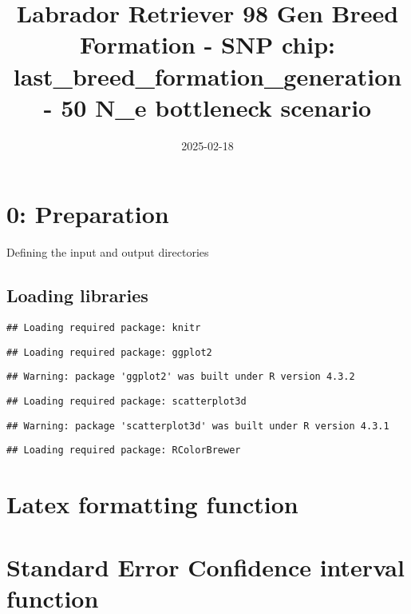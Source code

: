 \documentclass[
]{article}
\title{Labrador Retriever 98 Gen Breed Formation - SNP chip:
last\_breed\_formation\_generation - 50 N\_e bottleneck scenario}
\author{}
\date{\vspace{-2.5em}2025-02-18}
\begin{document}
\maketitle

{
\setcounter{tocdepth}{2}
\tableofcontents
}
\section{0: Preparation}\label{preparation}

Defining the input and output directories

\subsection{Loading libraries}\label{loading-libraries}

\begin{verbatim}
## Loading required package: knitr
\end{verbatim}

\begin{verbatim}
## Loading required package: ggplot2
\end{verbatim}

\begin{verbatim}
## Warning: package 'ggplot2' was built under R version 4.3.2
\end{verbatim}

\begin{verbatim}
## Loading required package: scatterplot3d
\end{verbatim}

\begin{verbatim}
## Warning: package 'scatterplot3d' was built under R version 4.3.1
\end{verbatim}

\begin{verbatim}
## Loading required package: RColorBrewer
\end{verbatim}

\section{Latex formatting function}\label{latex-formatting-function}

\section{Standard Error Confidence interval
function}\label{standard-error-confidence-interval-function}
\end{document}
